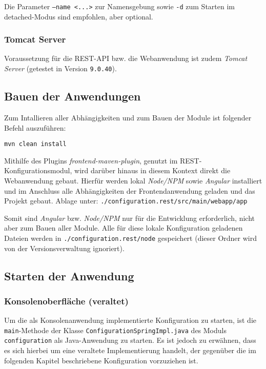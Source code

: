Die Parameter \texttt{--name <...>} zur Namensgebung sowie \texttt{-d} zum Starten im detached-Modus sind empfohlen, aber optional.


\subsubsection{Tomcat Server}

Voraussetzung für die REST-API bzw. die Webanwendung ist zudem \textit{Tomcat Server} (getestet in Version \texttt{9.0.40}).

\subsection{Bauen der Anwendungen}\label{subsec:bauen-der-anwendungen}

Zum Intallieren aller Abhängigkeiten und zum Bauen der Module ist folgender Befehl auszuf\"uhren:

\begin{lstlisting}[label={lst:mvncleaninstall}]
mvn clean install
\end{lstlisting}

Mithilfe des Plugins \textit{frontend-maven-plugin}, genutzt im REST-Konfigurationsmodul, 
wird darüber hinaus in diesem Kontext direkt die Webanwendung gebaut.
Hierfür werden lokal \textit{Node/NPM} sowie \textit{Angular} installiert und
im Anschluss alle Abhängigkeiten der Frontendanwendung geladen und das Projekt gebaut. Ablage unter: 
\newline\texttt{./configuration.rest/src/main/webapp/app}

Somit sind \textit{Angular} bzw. \textit{Node/NPM} nur für die Entwicklung erforderlich, nicht aber zum Bauen aller Module. 
Alle für diese lokale Konfiguration geladenen Dateien werden in \texttt{./configuration.rest/node} gespeichert
(dieser Ordner wird von der Versionsverwaltung ignoriert).



\subsection{Starten der Anwendung}

\subsubsection{Konsolenoberfläche (veraltet)}

Um die als Konsolenanwendung implementierte Konfiguration zu starten, ist die \texttt{main}-Methode der 
Klasse \texttt{ConfigurationSpringImpl.java} des Moduls \texttt{configuration} als Java-Anwendung zu starten.
Es ist jedoch zu erwähnen, dass es sich hierbei um eine veraltete Implementierung handelt, der gegenüber die
im folgenden Kapitel beschriebene Konfiguration vorzuziehen ist.

